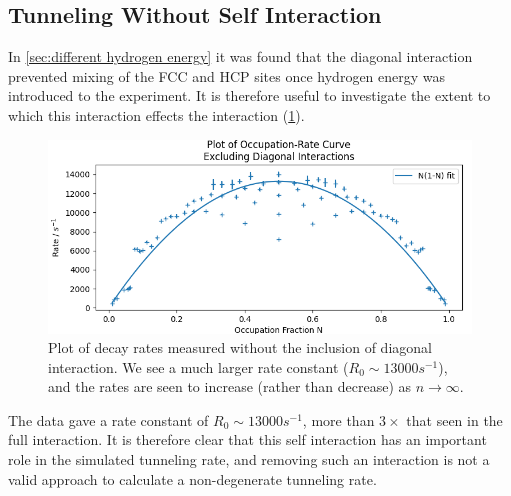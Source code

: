 \subsection{Tunneling Without Self Interaction}\label{sec:tunnelling no diagonal}
In \cref{sec:different hydrogen energy}
it was found that the diagonal interaction
prevented mixing of the FCC and HCP
sites once hydrogen energy was introduced
to the experiment. It is therefore
useful to investigate the extent
to which this interaction
effects the interaction (\cref{fig:non diagonal decay rates}).
\begin{figure}[htbp]
    \centering
    \includegraphics[width=0.7\linewidth]{Figures/Simulation/Occupation Rate Curve No Diagonal.png}
    \caption{Plot of decay rates measured without
        the inclusion of diagonal interaction.
        We see a much larger rate constant (\(R_0 \sim{} 13000 s^{-1}\)),
        and the rates are seen to
        increase (rather than
        decrease) as \(n\rightarrow{}\infty{}\).
    }\label{fig:non diagonal decay rates}
\end{figure}
The data gave
a rate constant
of \(R_0 \sim{} 13000 s^{-1}\),
more than \(3\times{}\) that seen in
the full interaction.
It is therefore
clear that this self interaction
has an important role
in the simulated
tunneling rate, and
removing such an interaction
is not a valid approach to
calculate a non-degenerate
tunneling rate.